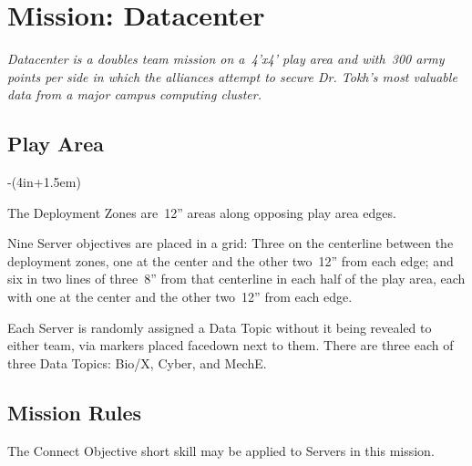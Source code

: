 \chapter{Mission: Datacenter}

\emph{\emph{Datacenter} is a doubles team mission on a~4'x4' play area
  and with~300 army points per side in which the alliances attempt to
  secure Dr. Tokh's most valuable data from a major campus computing
  cluster.}

\section{Play Area}
\vspace{-2\parskip}
\noindent\begin{stdminipage}{\linewidth-(4in+1.5em)}
\vspace{0pt}   

The Deployment Zones are~12'' areas along opposing play area edges.

Nine Server objectives are placed in a grid: Three on the centerline
between the deployment zones, one at the center and the other two~12''
from each edge; and six in two lines of three~8'' from that centerline
in each half of the play area, each with one at the center and the
other two~12'' from each edge.

Each Server is randomly assigned a Data Topic without it being
revealed to either team, via markers placed facedown next to them.
There are three each of three Data Topics: Bio/X, Cyber, and MechE.

\section{Mission Rules}

The Connect Objective short skill may be applied to Servers in this
mission.

\end{stdminipage}
\hfill
